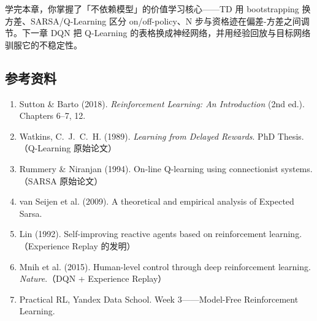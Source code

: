 \documentclass{article}
\begin{document}
{\raggedright
学完本章，你掌握了「不依赖模型」的价值学习核心——TD 用 bootstrapping 换方差、SARSA/Q-Learning 区分 on/off-policy、N 步与资格迹在偏差-方差之间调节。下一章 DQN 把 Q-Learning 的表格换成神经网络，并用经验回放与目标网络驯服它的不稳定性。
\par}

\subsection*{参考资料}

\begin{enumerate}
  \item Sutton \& Barto (2018). \textit{Reinforcement Learning: An Introduction} (2nd ed.). Chapters 6--7, 12.
  \item Watkins, C.\ J.\ C.\ H. (1989). \textit{Learning from Delayed Rewards}. PhD Thesis.（Q-Learning 原始论文）
  \item Rummery \& Niranjan (1994). On-line Q-learning using connectionist systems.（SARSA 原始论文）
  \item van Seijen et al. (2009). A theoretical and empirical analysis of Expected Sarsa.
  \item Lin (1992). Self-improving reactive agents based on reinforcement learning.（Experience Replay 的发明）
  \item Mnih et al. (2015). Human-level control through deep reinforcement learning. \textit{Nature}.（DQN + Experience Replay）
  \item Practical RL, Yandex Data School. Week 3——Model-Free Reinforcement Learning.
\end{enumerate}
\end{document}
